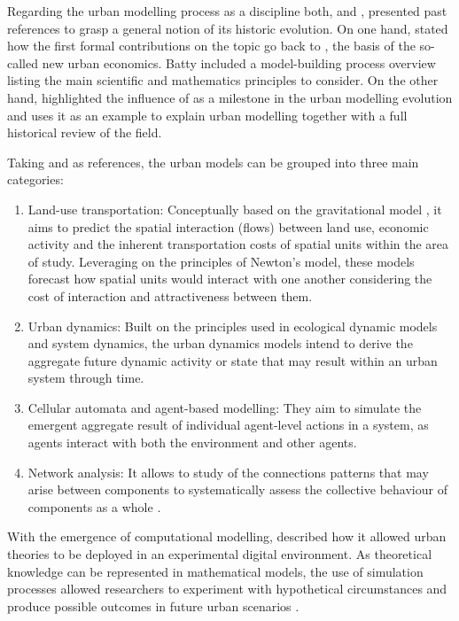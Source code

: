 \documentclass[12pt, a4paper]{report}
\begin{document}
Regarding the urban modelling process as a discipline both, \cite{battyUrbanModeling2009a} and \cite{wilsonFutureUrbanModelling2018}, presented past references to grasp a general notion of its historic evolution. On one hand, \cite{battyUrbanModeling2009a} stated how the first formal contributions on the topic go back to \cite{alonsoLocationLandUse1964}, the basis of the so-called new urban economics. Batty included a model-building process overview listing the main scientific and mathematics principles to consider. On the other hand, \cite{wilsonScienceCitiesRegions2012} highlighted the influence of \cite{lowryModelMetropolis1964} as a milestone in the urban modelling evolution and uses it as an example to explain urban modelling together with a full historical review of the field.

Taking \cite{battyUrbanModeling2009a} and \cite{wilsonFutureUrbanModelling2018} as references, the urban models can be grouped into three main categories: 

\begin{enumerate}
  \item Land-use transportation: Conceptually based on the gravitational model \citep{battyUrbanModellingAlgorithms1976}, it aims to predict the spatial interaction (flows) between land use, economic activity and the inherent transportation costs of spatial units within the area of study. Leveraging on the principles of Newton's model, these models forecast how spatial units would  interact with one another considering the cost of interaction and attractiveness between them.
  \item Urban dynamics: Built on the principles used in ecological dynamic models and system dynamics, the urban dynamics models intend to derive the aggregate future dynamic activity or state that may result within an urban system through time.
  \item Cellular automata and agent-based modelling: They aim to simulate the emergent aggregate result of individual agent-level actions in a system, as agents interact with both the environment and other agents.
  \item Network analysis: It allows to study of the connections patterns that may arise between components to systematically assess the collective behaviour of components as a whole \citep{newmanNetworksIntroduction2010}.
\end{enumerate}

With the emergence of computational modelling, \cite{battyUrbanModeling2009a} described how it allowed urban theories to be deployed in an experimental digital environment. As theoretical knowledge can be represented in mathematical models, the use of simulation processes allowed researchers to experiment with hypothetical circumstances and produce possible outcomes in future urban scenarios \citep{battyUrbanModeling2009a}.
\end{document}
